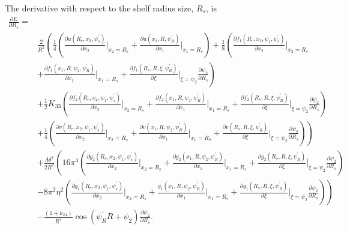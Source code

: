 \documentclass[12pt]{article}
\begin{document}
The derivative with respect to the shelf radius size, $R_s$, is
\begin{align}
\frac{\partial E}{\partial R_s}=&\nonumber\\
&\frac{2}{R^2}\left(\frac{1}{4}\left(\frac{\partial u(R_c,x_2,\psi_s^{\prime})}{\partial x_2}\bigg|_{x_2=R_s}+\frac{\partial u(x_1,R,\psi_R^{\prime})}{\partial x_1}\bigg|_{x_1=R_s}\right)+\frac{1}{8}\left(\frac{\partial f_1(R_c,x_2,\psi_1,\psi_s^{\prime})}{\partial x_2}\bigg|_{x_2=R_s}\right.\right.\nonumber\\
&\left.+\frac{\partial f_1(x_1,R,\psi_2,\psi_R^{\prime})}{\partial x_1}\bigg|_{x_1=R_s}+\frac{\partial f_1(R_s,R,\xi,\psi_R^{\prime})}{\partial\xi}\bigg|_{\xi=\psi_2}\frac{\partial\psi_2}{\partial R_s}\right)\nonumber\\
&+\frac{1}{2}K_{33}\left(\frac{\partial f_2(R_c,x_2,\psi_1,\psi_s^{\prime})}{\partial x_2}\bigg|_{x_2=R_s}+\frac{\partial f_2(x_1,R,\psi_2,\psi_R^{\prime})}{\partial x_1}\bigg|_{x_1=R_s}+\frac{\partial f_2(R_s,R,\xi,\psi_R^{\prime})}{\partial\xi}\bigg|_{\xi=\psi_2}\frac{\partial\psi_2}{\partial R_s}\right)\nonumber\\
&\left.+\frac{1}{4}\left(\frac{\partial v(R_c,x_2,\psi_1,\psi_s^{\prime})}{\partial x_2}\bigg|_{x_2=R_s}+\frac{\partial v(x_1,R,\psi_2,\psi_R^{\prime})}{\partial x_1}\bigg|_{x_1=R_2}+\frac{\partial v(R_s,R,\xi,\psi_R^{\prime})}{\partial\xi}\bigg|_{\xi=\psi_2}\frac{\partial\psi_2}{\partial R_s}\right)\right)\nonumber\\
&+\frac{\Lambda\delta^2}{2R^2}\left(16\pi^4\left(\frac{\partial g_2(R_c,x_2,\psi_1,\psi_s^{\prime})}{\partial x_2}\bigg|_{x_2=R_s}+\frac{\partial g_2(x_1,R,\psi_2,\psi_R^{\prime})}{\partial x_1}\bigg|_{x_1=R_s}+\frac{\partial g_2(R_s,R,\xi,\psi_R^{\prime})}{\partial\xi}\bigg|_{\xi=\psi_2}\frac{\partial \psi_2}{\partial R_s}\right)\right.\nonumber\\
&\left.-8\pi^2\eta^2\left(\frac{\partial g_1(R_c,x_2,\psi_1,\psi_s^{\prime})}{\partial x_2}\bigg|_{x_2=R_s}+\frac{g_1(x_1,R,\psi_2,\psi_R^{\prime})}{\partial x_1}\bigg|_{x_1=R_s}+\frac{\partial g_1(R_s,R,\xi,\psi_R^{\prime})}{\partial \xi}\bigg|_{\xi=\psi_2}\frac{\partial\psi_2}{\partial R_s}\right)\right)\nonumber\\
&-\frac{(1+k_{24})}{R^2}\cos(\psi_R^{\prime}R+\psi_2)\frac{\partial\psi_2}{\partial R_s}.\label{eq:dEdRs}
\end{align}
\end{document}
